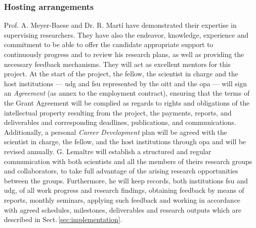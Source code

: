 


\subsubsection*{Hosting arrangements}

Prof. A. Meyer-Baese and Dr. R. Mart\'i have demonstrated their expertise in supervising researchers.
They have also the endeavor, knowledge, experience and commitment to be able to offer the candidate appropriate support to continuously progress and to review his research plans, as well as providing the necessary feedback mechanisms.
They will act as excellent mentors for this project.
At the start of the project, the fellow, the scientist in charge and the host institutions --- \ac{udg} and \ac{fsu} represented by the \ac{oitt} and the \ac{opa} --- will sign an \emph{Agreement} (as annex to the employment contract), ensuring that the terms of the Grant Agreement will be complied as regards to rights and obligations of the intellectual property resulting from the project, the payments, reports, and deliverables and corresponding deadlines, publications, and communications.
Additionally, a personal \emph{Career Development} plan will be agreed with the scientist in charge, the fellow, and the host institutions through \ac{opa} and will be revised annually.
G. Lema\^itre will establish a structured and regular communication with both scientists and all the members of theirs research groups and collaborators, to take full advantage of the arising research opportunities between the groups.
Furthermore, he will keep records, both institutions \ac{fsu} and \ac{udg}, of all work progress and research findings, obtaining feedback by means of reports, monthly seminars, applying such feedback and working in accordance with agreed schedules, milestones, deliverables and research outputs which are described in Sect.\,\ref{sec:implementation}.

